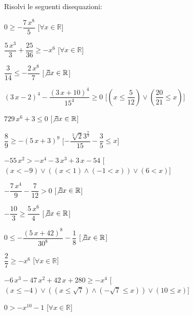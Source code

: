 \begin{esercizio}\label{ese:03.1}
Risolvi le seguenti disequazioni:
\begin{enumeratea}
\item $0\geq -{\dfrac{7\,{x}^{8}}{5}}$ 
\hfill [$\forall x \in \mathbb{R}$]
\item ${\dfrac{5\,{x}^{3}}{3}}+{\dfrac{25}{36}}\geq -{x}^{6}$ 
\hfill [$\forall x \in \mathbb{R}$]
\item ${\dfrac{3}{14}}\leq -{\dfrac{2\,{x}^{8}}{7}}$ 
\hfill [$\not\exists x \in \mathbb{R}$]
\item $ \left( 3\,x-2 \right) ^{4}-{\dfrac{ \left( 3\,x+10 \right) 
^{4}}{15^4}}\geq 0$ 
\hfill [$(x\leq {\dfrac{5}{12}})\vee ({\dfrac{20}{21}}\leq x)$]
\item $729\,{x}^{6}+3\leq 0$ 
\hfill [$\not\exists x \in \mathbb{R}$]
\item ${\dfrac{8}{9}}\geq - \left( 5\,x+3 \right) ^{9}$ 
\hfill [$-{\dfrac{\sqrt [3]{2}{3}^{{\frac{7}{9}}}}{15}}-{\dfrac
{3}{5}}\leq x$]
\item $-55\,{x}^{2}>-{x}^{4}-3\,{x}^{3}+3\,x-54$ 
\hfill [$(x<-9)\vee ((x<1) \wedge (-1<x))\vee (6<x)$]
\item $-{\dfrac{7\,{x}^{4}}{9}}-{\dfrac{7}{12}}>0$ 
\hfill [$\not\exists x \in \mathbb{R}$]
\item $-{\dfrac{10}{3}}\geq {\dfrac{5\,{x}^{6}}{4}}$ 
\hfill [$\not\exists x \in \mathbb{R}$]
\item $0\leq -{\dfrac{ \left( 5\,x+42 \right) ^{8}}{30^8}}-{\dfrac
{1}{8}}$ 
\hfill [$\not\exists x \in \mathbb{R}$]
\item ${\dfrac{2}{7}}\geq -{x}^{6}$ 
\hfill [$\forall x \in \mathbb{R}$]
\item $-6\,{x}^{3}-47\,{x}^{2}+42\,x+280\geq -{x}^{4}$ 
\hfill [$(x\leq -4)\vee ((x\leq \sqrt {7}) \wedge (-\sqrt {7}\leq x))\vee 
(10\leq x)$]
\item $0>-{x}^{10}-1$ 
\hfill [$\forall x \in \mathbb{R}$]

\end{enumeratea}
\end{esercizio}
